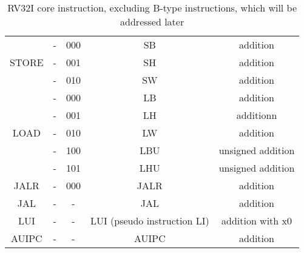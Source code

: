 \begin{table}[h!]
\begin{center}
\begin{tabular}{|c|c|c|c|c|}
            \multirow{3}{*}{STORE} & - & 000 & SB & addition\\
            & - & 001 & SH & addition\\
            & - & 010 & SW & addition\\
            \hline
            \multirow{5}{*}{LOAD} & - & 000 & LB & addition\\
            & - & 001 & LH & additionn\\
            & - & 010 & LW & addition\\
            & - & 100 & LBU & unsigned addition\\
            & - & 101 & LHU & unsigned addition\\
            \hline
            JALR & - & 000 & JALR & addition\\
            \hline
            JAL & - & - & JAL & addition\\
            \hline
            LUI & - & - & LUI (pseudo instruction LI) & addition with x0\\
            \hline
            AUIPC & - & - & AUIPC & addition\\
            \hline
        \end{tabular}
        \caption{RV32I core instruction, excluding B-type instructions, which will be addressed later}
        \label{table:core_instr_funct3}
    \end{center}
\end{table}

